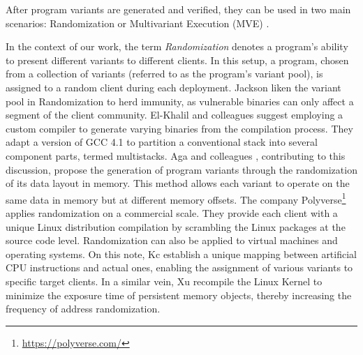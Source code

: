 
After program variants are generated and verified, they can be used in two main scenarios: Randomization or Multivariant Execution (MVE) \cite{jackson}. 

In the context of our work, the term \emph{Randomization} denotes a program's ability to present different variants to different clients. 
In this setup, a program, chosen from a collection of variants (referred to as the program's variant pool), is assigned to a random client during each deployment. 
Jackson \etal \cite{jackson} liken the variant pool in Randomization to herd immunity, as vulnerable binaries can only affect a segment of the client community. 
El-Khalil and colleagues \cite{ElKhalil2004} suggest employing a custom compiler to generate varying binaries from the compilation process. 
They adapt a version of GCC 4.1 to partition a conventional stack into several component parts, termed multistacks. 
Aga and colleagues \cite{aga2019smokestack}, contributing to this discussion, propose the generation of program variants through the randomization of its data layout in memory. 
This method allows each variant to operate on the same data in memory but at different memory offsets. 
The company Polyverse\footnote{\url{https://polyverse.com/}} applies randomization on a commercial scale. 
They provide each client with a unique Linux distribution compilation by scrambling the Linux packages at the source code level. 
Randomization can also be applied to virtual machines and operating systems. On this note, Kc \etal \cite{Kc03} establish a unique mapping between artificial CPU instructions and actual ones, enabling the assignment of various variants to specific target clients. 
In a similar vein, Xu \etal \cite{xu2020merr} recompile the Linux Kernel to minimize the exposure time of persistent memory objects, thereby increasing the frequency of address randomization.


